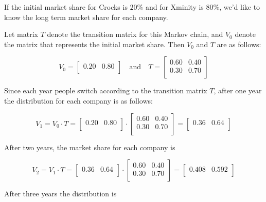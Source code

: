 If the initial market share for Crocks is \( 20\% \) and for Xminity is \( 80\% \), we'd like to know the long term market share for each company.

Let matrix \( T \) denote the transition matrix for this Markov chain, and \( V_0 \) denote the matrix that represents the initial market share. Then \( V_0 \) and \( T \) are as follows:

\[
    V_0 = \begin{bmatrix}
        0.20 & 0.80 \\
    \end{bmatrix}
    \quad \text{and} \quad
    T = \begin{bmatrix}
        0.60 & 0.40 \\
        0.30 & 0.70 \\
    \end{bmatrix}
\]

Since each year people switch according to the transition matrix \( T \), after one year the distribution for each company is as follows:

\[
    V_1 = V_0 \cdot T = \begin{bmatrix}
        0.20 & 0.80 \\
    \end{bmatrix} \cdot \begin{bmatrix}
        0.60 & 0.40 \\
        0.30 & 0.70 \\
    \end{bmatrix} = \begin{bmatrix}
        0.36 & 0.64 \\
    \end{bmatrix}
\]

After two years, the market share for each company is

\[
    V_2 = V_1 \cdot T = \begin{bmatrix}
        0.36 & 0.64 \\
    \end{bmatrix} \cdot \begin{bmatrix}
        0.60 & 0.40 \\
        0.30 & 0.70 \\
    \end{bmatrix} = \begin{bmatrix}
        0.408 & 0.592 \\
    \end{bmatrix}
\]

After three years the distribution is

